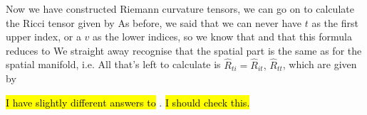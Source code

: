 \documentclass{article}
\begin{document}
Now we have constructed Riemann curvature tensors, we can go on to calculate the Ricci tensor given by 
As before, we said that we can never have $t$ as the first upper index, or a $v$ as the lower indices, so we know that 
and that this formula reduces to 
We straight away recognise that the spatial part is the same as for the spatial manifold, i.e. 
All that's left to calculate is $\hat{R}_{ti} = \hat{R}_{it}, \, \hat{R}_{tt}
$, which are given by

\hl{I have slightly different answers to} \cite{Brinkmann1925,Duval1991}. \hl{I should check this.}
\end{document}
